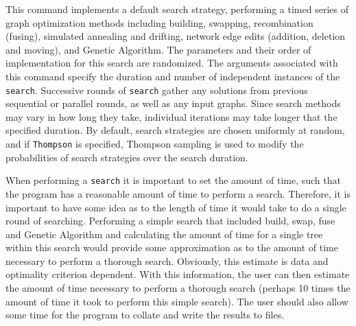 	\begin{phygdescription}
		{This command implements a default search strategy, performing a timed 
		 series of graph optimization methods including building, swapping, 
		recombination (fusing), simulated annealing and drifting, network edge edits
		(addition, deletion and moving), and Genetic Algorithm. The parameters and 
		their order of implementation for this search are randomized. The arguments 
		associated with this command specify the duration and number of independent 
		instances of the \texttt{search}. Successive rounds of \texttt{search} gather any 
		solutions from previous sequential or parallel rounds, as well as any input graphs. 
		Since search methods may vary in how long they take, individual iterations may 
		take longer that the specified duration.  By default, search strategies are chosen 
		uniformly at random, and if \texttt{Thompson} is specified, Thompson sampling 
		\cite{Thompson1933,WheelerThompson} is used to modify the probabilities 
		of search strategies over the search duration.
		
		When performing a \texttt{search} it is important to set the amount of time, 
		such that the program has a reasonable amount of time to perform a search. 
		Therefore, it is important to have some idea as to the length of time 
		it would take to do a single round of searching.  Performing a simple search 
		that included build, swap, fuse and Genetic Algorithm and calculating the 
		amount of time for a single tree within this search would provide some 
		approximation as to the amount of time necessary to perform a thorough 
		search. Obviously, this estimate is data and optimality criterion dependent. 
		With this information, the user can then estimate the amount of time necessary 
		to perform a thorough search (perhaps 10 times the amount of time it took to 
		perform this simple search). The user should also allow some time for the program 
		to collate and write the results to files.}
	\end{phygdescription}
			
